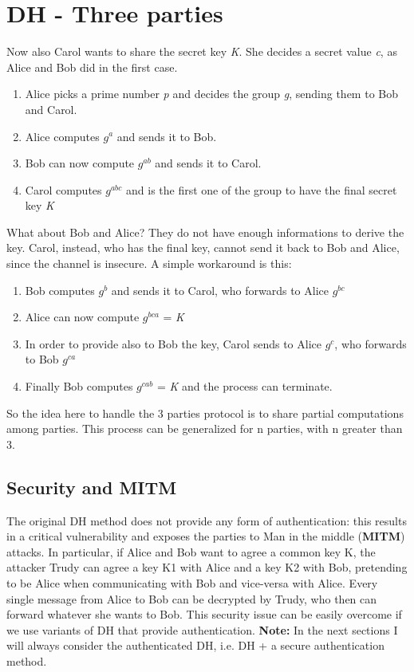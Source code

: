 \documentclass[11 pt]{article}
\begin{document}
\section{DH - Three parties}
Now also Carol wants to share the secret key \textit{K}. She decides a secret value \textit{c}, as Alice and Bob did in the first case.

\begin{enumerate}
	\item Alice picks a prime number \textit{p} and decides the group \textit{g}, sending them to Bob and Carol.
	\item Alice computes $g^a$ and sends it to Bob.
	\item Bob can now compute $g^{ab}$ and sends it to Carol.
	\item Carol computes $g^{abc}$ and is the first one of the group to have the final secret key \textit{K}
\end{enumerate}
What about Bob and Alice? They do not have enough informations to derive the key. Carol, instead, who has the final key, cannot send it back to Bob and Alice, since the channel is insecure. A simple workaround is this:

\begin{enumerate}
	\item Bob computes $g^b$ and sends it to Carol, who forwards to Alice $g^{bc}$
	\item Alice can now compute $g^{bca}$ = \textit{K}
	\item In order to provide also to Bob the key, Carol sends to Alice $g^c$, who forwards to Bob $g^{ca}$
	\item Finally Bob computes $g^{cab}$ = \textit{K} and the process can terminate.	
\end{enumerate}
So the idea here to handle the 3 parties protocol is to share partial computations among parties. This process can be generalized for n parties, with n greater than 3.

\subsection{Security and MITM}
The original DH method does not provide any form of authentication: this results in a critical vulnerability and exposes the parties to Man in the middle (\textbf{MITM}) attacks. In particular, if Alice and Bob want to agree a common key K, the attacker Trudy can agree a key K1 with Alice and a key K2 with Bob, pretending to be Alice when communicating with Bob and vice-versa with Alice. Every single message from Alice to Bob can be decrypted by Trudy, who then can forward whatever she wants to Bob. This security issue can be easily overcome if we use variants of DH that provide authentication.
\newline\newline
\textbf{Note:} In the next sections I will always consider the authenticated DH, i.e. DH + a secure authentication method.
\end{document}
